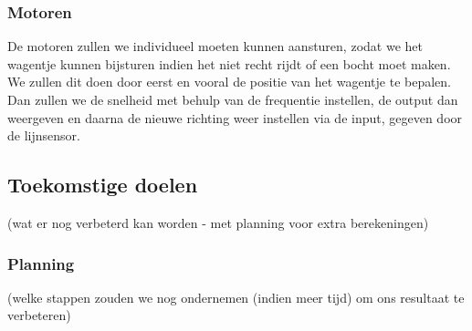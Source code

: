 \documentclass[kulak]{kulakarticle} %
\begin{document}
\subsubsection{Motoren}
De motoren zullen we individueel moeten kunnen aansturen, zodat we het wagentje  kunnen bijsturen indien het niet recht rijdt of een bocht moet maken. We zullen dit doen door eerst en vooral de positie van het wagentje te bepalen. Dan zullen we de snelheid met behulp van de frequentie instellen, de output dan weergeven en daarna de nieuwe richting weer instellen via de input, gegeven door de lijnsensor. 
\subsection{Toekomstige doelen}
(wat er nog verbeterd kan worden - met planning voor extra berekeningen)
\subsubsection{Planning} %
(welke stappen zouden we nog ondernemen (indien meer tijd) om ons resultaat te verbeteren)
\end{document}
